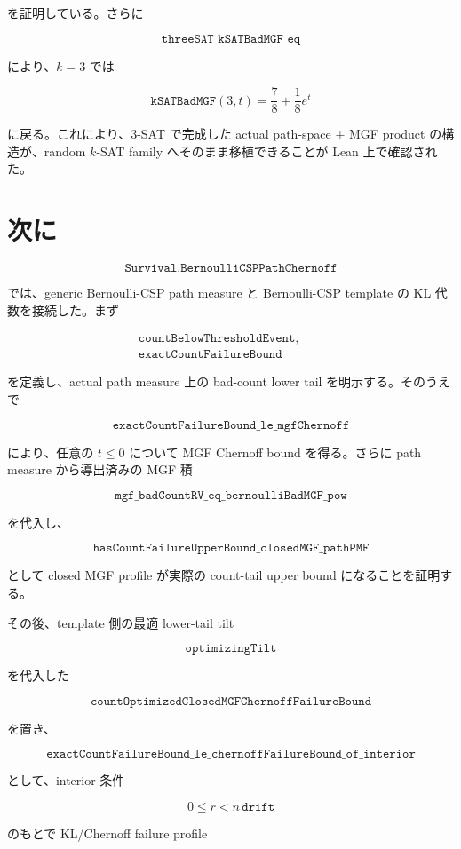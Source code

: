 \documentclass[12pt,a4paper]{article}
\begin{document}
を証明している。さらに

\[
\texttt{threeSAT\_kSATBadMGF\_eq}
\]

により、\(k=3\) では

\[
\texttt{kSATBadMGF}(3,t)=\frac78+\frac18 e^t
\]

に戻る。これにより、3-SAT で完成した actual path-space + MGF product の構造が、random \(k\)-SAT family へそのまま移植できることが Lean 上で確認された。

\section{次に}\label{ux6b21ux306b}

\[
\texttt{Survival.BernoulliCSPPathChernoff}
\]

では、generic Bernoulli-CSP path measure と Bernoulli-CSP template の KL 代数を接続した。まず

\[
\begin{aligned}
\texttt{countBelowThresholdEvent},\qquad \\
\texttt{exactCountFailureBound}
\end{aligned}
\]

を定義し、actual path measure 上の bad-count lower tail を明示する。そのうえで

\[
\texttt{exactCountFailureBound\_le\_mgfChernoff}
\]

により、任意の \(t\le 0\) について MGF Chernoff bound を得る。さらに path measure から導出済みの MGF 積

\[
\texttt{mgf\_badCountRV\_eq\_bernoulliBadMGF\_pow}
\]

を代入し、

\[
\texttt{hasCountFailureUpperBound\_closedMGF\_pathPMF}
\]

として closed MGF profile が実際の count-tail upper bound になることを証明する。

その後、template 側の最適 lower-tail tilt

\[
\texttt{optimizingTilt}
\]

を代入した

\[
\texttt{countOptimizedClosedMGFChernoffFailureBound}
\]

を置き、

\[
\texttt{exactCountFailureBound\_le\_chernoffFailureBound\_of\_interior}
\]

として、interior 条件

\[
0\le r < n\,\texttt{drift}
\]

のもとで KL/Chernoff failure profile
\end{document}
